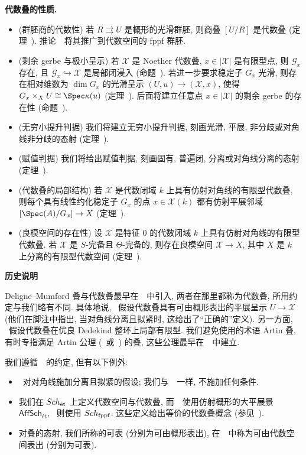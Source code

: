 \textbf{代数叠的性质.}
\begin{itemize}
\item (群胚商的代数性) 若 $R\rightrightarrows U$ 是概形的光滑群胚, 则商叠 $[U/R]$ 是代数叠 (定理~). 推论~~将其推广到代数空间的 fppf 群胚.
\item (剩余 gerbe 与极小呈示) 若 $\mathcal X$ 是 Noether 代数叠, $x\in|\mathcal X|$ 是有限型点, 则 $\mathcal G_x$ 存在, 且 $\mathcal G_x\hookrightarrow\mathcal X$ 是局部闭浸入 (命题~).
若进一步要求稳定子 $G_x$ 光滑, 则存在相对维数为 $\dim G_x$ 的光滑呈示 $(U,u)\to(\mathcal X,x)$, 使得 $\mathcal G_x\times_{\mathcal X}U\cong\Spec\kappa(u)$ (定理~).
后面将建立任意点 $x\in|\mathcal X|$ 的剩余 gerbe 的存在性 (命题~).
\item (无穷小提升判据) 我们将建立无穷小提升判据, 刻画光滑, 平展, 非分歧或对角线非分歧的态射 (定理~).
\item (赋值判据) 我们将给出赋值判据, 刻画固有, 普遍闭, 分离或对角线分离的态射 (定理~).
\item (代数叠的局部结构) 若 $\mathcal X$ 是代数闭域 $k$ 上具有仿射对角线的有限型代数叠, 则每个具有线性约化稳定子 $G_x$ 的点 $x\in\mathcal X(k)$ 都有仿射平展邻域 $[\Spec(A)/G_x]\to\mathcal X$ (定理~).
\item (良模空间的存在性) 设 $\mathcal X$ 是特征 $0$ 的代数闭域 $k$ 上具有仿射对角线的有限型代数叠.
若 $\mathcal X$ 是 $S$-完备且 $\Theta$-完备的, 则存在良模空间 $\mathcal X\to X$, 其中 $X$ 是 $k$ 上分离的有限型代数空间 (定理~).
\end{itemize}

\textbf{历史说明}

Deligne--Mumford 叠与代数叠最早在~\cite{DM69,Art74b}~中引入, 两者在那里都称为代数叠, 所用约定与我们略有不同.
具体地说, \cite[定义 $4.6$]{DM69}~假设代数叠具有可由概形表出的平展呈示 $U\to\mathcal X$ (他们在脚注中指出, 当对角线分离且拟紧时, 这给出了``正确的''定义).
另一方面, \cite[定义 $5.1$]{Art74b}~假设代数叠在优良 Dedekind 整环上局部有限型.
我们避免使用的术语 Artin 叠, 有时专指满足 Artin 公理 (~或~) 的叠, 这些公理最早在~\cite[定理 $5.3$]{Art74b}~中建立.

我们遵循~\cite{LMB00,Ols16,SP}~的约定, 但有以下例外:
\begin{itemize}
\item \cite{LMB00}~对对角线施加分离且拟紧的假设; 我们与~\cite{Ols16,SP}~一样, 不施加任何条件.
\item 我们在 $Sch_{\text{ét}}$ 上定义代数空间与代数叠, 而~\cite{LMB00}~使用仿射概形的大平展景 $\mathsf{AffSch}_{\text{ét}}$, \cite{SP}~则使用 $Sch_{\mathrm{fppf}}$.
这些定义给出等价的代数叠概念 (参见~\cite[Tag 076U]{SP}).
\item 对叠的态射, 我们所称的可表 (分别为可由概形表出), 在~\cite[Tags 02ZW 和 02Y7]{SP}~中称为可由代数空间表出 (分别为可表).
\end{itemize}
\flushbottom
